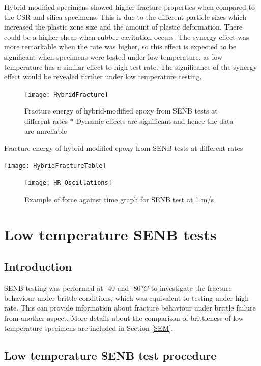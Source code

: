 \documentclass[numbers=noendperiod,chapterprefix=on]{icldt} %
\begin{document}
Hybrid-modified specimens showed higher fracture properties when compared to the CSR and silica specimens. This is due to the different particle sizes which increased the plastic zone size and the amount of plastic deformation. There could be a higher shear when rubber cavitation occurs. 
The synergy effect was more remarkable when the rate was higher, so this effect is expected to be significant when specimens were tested under low temperature, as low temperature has a similar effect to high test rate. The significance of the synergy effect would be revealed further under low temperature testing.

\begin{figure}[!htpb]
\centering
\texttt{[image: HybridFracture]}
\caption{Fracture energy of hybrid-modified epoxy from SENB tests at different rates \newline $\ast$ Dynamic effects are significant and hence the data are unreliable} \label{HybridFracture}
\end{figure}
\FloatBarrier

\begin{table}[!htpb]
\centering
\caption{Fracture energy of hybrid-modified epoxy from SENB tests at different rates} \label{HybridFractureTable}
\texttt{[image: HybridFractureTable]}
\end{table}
\FloatBarrier


\begin{figure}[!htpb]
\centering
\texttt{[image: HR\_Oscillations]}
\caption{Example of force against time graph for SENB test at 1 m/s} \label{HR_Oscillations}
\end{figure}
\FloatBarrier


\section{Low temperature SENB tests} \label{LTSENB}

\subsection{Introduction}
SENB testing was performed at -40 and -80$^oC$ to investigate the fracture behaviour under brittle conditions, which was equivalent to testing under high rate. This can provide information about fracture behaviour under brittle failure from another aspect. More details about the comparison of brittleness of low temperature specimens are included in Section \ref{SEM}.

\subsection{Low temperature SENB test procedure}
\end{document}
